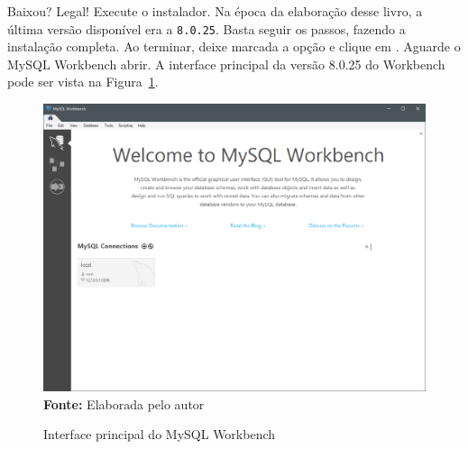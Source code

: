 Baixou? Legal! Execute o instalador. Na época da elaboração desse livro, a última versão disponível era a \texttt{8.0.25}. Basta seguir os passos, fazendo a instalação completa. Ao terminar, deixe marcada a opção  e clique em . Aguarde o MySQL Workbench abrir. A interface principal da versão 8.0.25 do Workbench pode ser vista na Figura~\ref{fig:cap04MySQLWorkbench}.

\FloatBarrier
\begin{figure}[!htbp]
    \centering
    \caption{Interface principal do MySQL Workbench}
    \includegraphics[scale=0.45]{imagens/cap04MySQLWorkbench}
    \\\textbf{Fonte:} Elaborada pelo autor
    \label{fig:cap04MySQLWorkbench}
\end{figure}
\FloatBarrier

